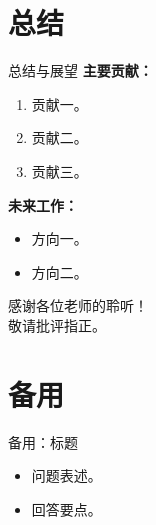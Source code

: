 \documentclass[10pt,aspectratio=169]{ctexbeamer}
\begin{document}
\section{总结}

\begin{frame}{总结与展望}
  \textbf{主要贡献：}
  \begin{enumerate}
    \item 贡献一。
    \item 贡献二。
    \item 贡献三。
  \end{enumerate}

  \pause\medskip
  \textbf{未来工作：}
  \begin{itemize}
    \item 方向一。
    \item 方向二。
  \end{itemize}
\end{frame}

\begin{frame}[plain]
  \vfill\centering
  {\large\alert{感谢各位老师的聆听！}}\\[0.5em]
  敬请批评指正。
  \vfill
\end{frame}

\appendix
\section*{备用}

\begin{frame}{备用：标题}
  \begin{itemize}
    \item 问题表述。
    \item 回答要点。
  \end{itemize}
\end{frame}
\end{document}
